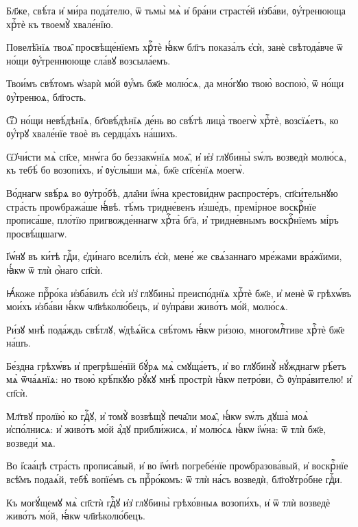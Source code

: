 \hKv Бл҃же, свѣ́та и҆ ми́ра пода́телю, ѿ тьмы̀ мѧ̀ и҆ бра́ни  страсте́й и҆зба́ви, ᲂу҆́тренююща хрⷭ҇тѐ къ твоемꙋ̀  хвале́нїю. 

\hKv Повелѣ̑нїѧ твоѧ̑ просвѣще́нїемъ хрⷭ҇тѐ ꙗ҆́кѡ бл҃гъ  показа́лъ є҆сѝ, занѐ свѣтода́вче ѿ но́щи  ᲂу҆́треннююще сла́вꙋ возсыла́емъ. 

\hKv Твои́мъ свѣ́томъ ѡ҆зарѝ мо́й ᲂу҆́мъ бж҃е молю́сѧ, да  мно́гꙋю твою̀ воспою̀, ѿ но́щи ᲂу҆́тренюѧ, бл҃гость.  

\hKv Ѿ но́щи невѣ́дѣнїѧ, бг҃овѣ́дѣнїѧ де́нь во свѣ́тѣ  лица̀ твоегѡ̀ хрⷭ҇тѐ, возсїѧ́етъ, ко ᲂу҆́трꙋ хвале́нїе  твоѐ въ сердца́хъ на́шихъ. 
%

\hKv Ѡ҆чи́сти мѧ̀ сп҃се, мнѡ́га бо беззакѡ́нїѧ моѧ̑, и҆ и҆з̾  глꙋбины̀ ѕѡ́лъ возведѝ молю́сѧ, къ тебѣ́ бо возопи́хъ, и҆  ᲂу҆слы́ши мѧ̀, бж҃е сп҃се́нїѧ моегѡ̀. 
%

\hKv Во́днагѡ ѕвѣ́рѧ во ᲂу҆тро́бѣ, дла̑ни  і҆ѡ́на крестови́днѡ распросте́ръ, сп҃си́тельнꙋю стра́сть  проѡбража́ше ꙗ҆́вѣ. тѣ́мъ тридне́венъ и҆зше́дъ,  премі́рное воскрⷭ҇нїе прописа́ше, пло́тїю пригвожде́ннагѡ  хрⷭ҇та̀ бг҃а, и҆ тридне́внымъ воскрⷭ҇нїемъ мі́ръ  просвѣ́щшагѡ. 
%

\hKv І҆ѡ́нꙋ въ ки́тѣ гдⷭ҇и, є҆ди́наго всели́лъ є҆сѝ, мене́ же  свѧ́заннаго мре́жами вра́жїими, ꙗ҆́кѡ ѿ тлѝ ѻ҆́наго  сп҃сѝ.  

\hKv Ꙗ҆́коже прⷪ҇ро́ка и҆зба́вилъ є҆сѝ и҆з̾ глꙋбины̀  преиспо́днїѧ хрⷭ҇тѐ бж҃е, и҆ менѐ ѿ грѣхѡ́въ мои́хъ  и҆зба́ви ꙗ҆́кѡ чл҃вѣколю́бецъ, и҆ ᲂу҆пра́ви живо́тъ мо́й,  молю́сѧ. 

\hKv Ри́зꙋ мнѣ̀ пода́ждь свѣ́тлꙋ, ѡ҆дѣѧ́йсѧ свѣ́томъ ꙗ҆́кѡ  ри́зою, многомлⷭ҇тиве хрⷭ҇тѐ бж҃е на́шъ. 

\hKv Бе́здна грѣхѡ́въ и҆ прегрѣше́нїй бꙋ́рѧ мѧ̀ смꙋща́етъ, и҆  во глꙋбинꙋ̀ нꙋ́жднагѡ рѣ́етъ мѧ̀ ѿча́ѧнїѧ: но твою̀  крѣ́пкꙋю рꙋ́кꙋ мнѣ̀ прострѝ ꙗ҆́кѡ петро́ви, ѽ  ᲂу҆пра́вителю! и҆ сп҃сѝ. 

\hKv Мл҃твꙋ пролїю̀ ко гдⷭ҇ꙋ, и҆ томꙋ̀ возвѣщꙋ̀ печа̑ли моѧ̑,  ꙗ҆́кѡ ѕѡ́лъ дꙋша̀ моѧ̀ и҆спо́лнисѧ: и҆ живо́тъ мо́й а҆́дꙋ  прибли́жисѧ, и҆ молю́сѧ ꙗ҆́кѡ і҆ѡ́на: ѿ тлѝ бж҃е,  возведи́ мѧ. 

\hKv Во і҆саа́цѣ стра́сть прописа́вый, и҆ во і҆ѡ́нѣ погребе́нїе  проѡбразова́вый, и҆ воскрⷭ҇нїе всѣ̑мъ подаѧ́й, тебѣ̀  вопїе́мъ съ прⷪ҇ро́комъ: ѿ тлѝ на́съ возведѝ,  бл҃гоꙋтро́бне гдⷭ҇и.  

\hKv Къ могꙋ́щемꙋ мѧ̀ сп҃стѝ гдⷭ҇ꙋ и҆з̾ глꙋбины̀ грѣхо́вныѧ  возопи́хъ, и҆ ѿ тлѝ возведѐ живо́тъ мо́й, ꙗ҆́кѡ  чл҃вѣколю́бецъ. 

